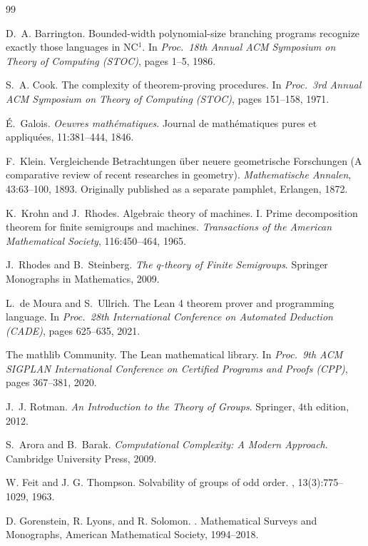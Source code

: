 \documentclass[11pt,a4paper]{article}
\theoremstyle{plain}
\theoremstyle{definition}
\begin{document}
\begin{thebibliography}{99}

D.~A. Barrington.
\newblock Bounded-width polynomial-size branching programs recognize exactly those languages in NC$^1$.
\newblock In \emph{Proc.\ 18th Annual ACM Symposium on Theory of Computing (STOC)}, pages 1--5, 1986.

S.~A. Cook.
\newblock The complexity of theorem-proving procedures.
\newblock In \emph{Proc.\ 3rd Annual ACM Symposium on Theory of Computing (STOC)}, pages 151--158, 1971.

\'{E}.~Galois.
\newblock \emph{Oeuvres math\'{e}matiques}.
\newblock Journal de math\'{e}matiques pures et appliqu\'{e}es, 11:381--444, 1846.

F.~Klein.
\newblock Vergleichende Betrachtungen \"{u}ber neuere geometrische Forschungen (A comparative review of recent researches in geometry).
\newblock \emph{Mathematische Annalen}, 43:63--100, 1893.
\newblock Originally published as a separate pamphlet, Erlangen, 1872.

K.~Krohn and J.~Rhodes.
\newblock Algebraic theory of machines. I. Prime decomposition theorem for finite semigroups and machines.
\newblock \emph{Transactions of the American Mathematical Society}, 116:450--464, 1965.

J.~Rhodes and B.~Steinberg.
\newblock \emph{The q-theory of Finite Semigroups}.
\newblock Springer Monographs in Mathematics, 2009.

L.~de Moura and S.~Ullrich.
\newblock The Lean 4 theorem prover and programming language.
\newblock In \emph{Proc.\ 28th International Conference on Automated Deduction (CADE)}, pages 625--635, 2021.

The mathlib Community.
\newblock The Lean mathematical library.
\newblock In \emph{Proc.\ 9th ACM SIGPLAN International Conference on Certified Programs and Proofs (CPP)}, pages 367--381, 2020.

J.~J. Rotman.
\newblock \emph{An Introduction to the Theory of Groups}.
\newblock Springer, 4th edition, 2012.

S.~Arora and B.~Barak.
\newblock \emph{Computational Complexity: A Modern Approach}.
\newblock Cambridge University Press, 2009.

W. Feit and J. G. Thompson.
\newblock Solvability of groups of odd order.
, 13(3):775--1029, 1963.

D. Gorenstein, R. Lyons, and R. Solomon.
.
\newblock Mathematical Surveys and Monographs, American Mathematical Society, 
1994--2018.

\end{thebibliography}
\end{document}
